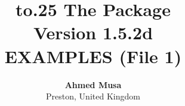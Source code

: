 \documentclass[a4paper,10pt,final,showpagenos]{article}
\begin{document}
\title{%
  {\setbox\z@\vbox to.25\paperheight{}}%
  \bfseries The \texttt{} Package
  \\[1ex]
  \large Version 1.5.2d\\[2ex]
  \Large EXAMPLES (File 1)%
}
\author{%
  \textbf{Ahmed Musa}\\Preston, United Kingdom\\
}
\maketitle

\thispagestyle{empty}

\newpage
\noindent
\ltslipsum[1-3]

\newpage
\ltslipsum[1-4]

\newpage
\ltslipsum[1-4]

\newpage
\ltslipsum[1-4]

\newpage
\ltslipsum[1-4]

\newpage
\ltslipsum[1-4]
\end{document}

